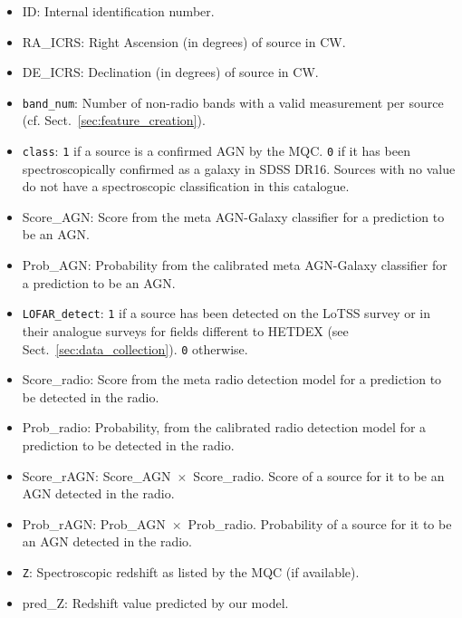 \documentclass{aa}
\begin{document}
\begin{appendix}
\begin{itemize}
\item ID: Internal identification number.
\item RA\_ICRS: Right Ascension (in degrees) of source in CW.
\item DE\_ICRS: Declination (in degrees) of source in CW.
\item \texttt{band\_num}: Number of non-radio bands with a valid measurement per source (cf. Sect.~\ref{sec:feature_creation}).
\item \texttt{class}: \verb|1| if a source is a confirmed AGN by the MQC. \verb|0| if it has been spectroscopically confirmed as a galaxy in SDSS DR16. Sources with no value do not have a spectroscopic classification in this catalogue.
\item Score\_AGN: Score from the meta AGN-Galaxy classifier for a prediction to be an AGN.
\item Prob\_AGN: Probability from the calibrated meta AGN-Galaxy classifier for a prediction to be an AGN.
\item \texttt{LOFAR\_detect}: \verb|1| if a source has been detected on the LoTSS survey or in their analogue surveys for fields different to HETDEX (see Sect.~\ref{sec:data_collection}). \verb|0| otherwise.
\item Score\_radio: Score from the meta radio detection model for a prediction to be detected in the radio.
\item Prob\_radio: Probability, from the calibrated radio detection model for a prediction to be detected in the radio.
\item Score\_rAGN: Score\_AGN~$\times$~Score\_radio. Score of a source for it to be an AGN detected in the radio.
\item Prob\_rAGN: Prob\_AGN~$\times$~Prob\_radio. Probability of a source for it to be an AGN detected in the radio.
\item \texttt{Z}: Spectroscopic redshift as listed by the MQC (if available).
\item pred\_Z: Redshift value predicted by our model.

\end{itemize}

\end{appendix}
\end{document}
